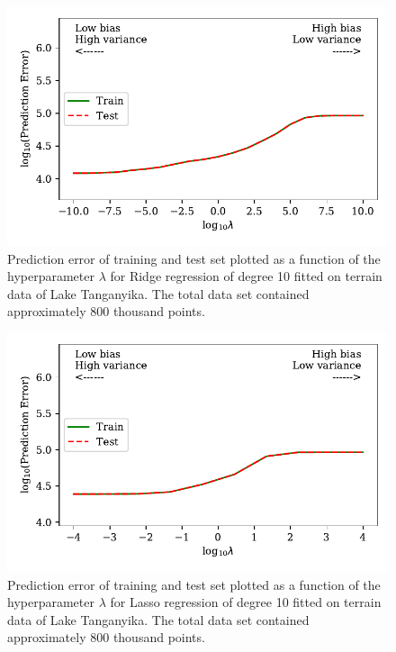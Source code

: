 \documentclass[a4paper, 10pt]{article}
\begin{document}
\begin{figure}[H]
    \includegraphics{figs/biasvariancetradeoff_Ridge_terrain.pdf}
    \caption{Prediction error of training and test set plotted as a function of the hyperparameter $\lambda$ for Ridge regression of degree 10 fitted on terrain data of Lake Tanganyika. The total data set contained approximately 800 thousand points.}
    \label{fig:bias_ridge_terrain}
\end{figure}

\begin{figure}[H]
    \includegraphics{figs/biasvariancetradeoff_LASSO_terrain.pdf}
    \caption{Prediction error of training and test set plotted as a function of the hyperparameter $\lambda$ for Lasso regression of degree 10 fitted on terrain data of Lake Tanganyika. The total data set contained approximately 800 thousand points.}
    \label{fig:bias_lasso_terrain}
\end{figure}
\end{document}
